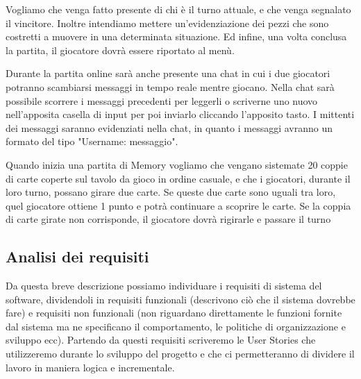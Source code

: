 \documentclass[12pt]{article}
\begin{document}
Vogliamo che venga fatto presente di chi è il turno attuale, e che venga segnalato il vincitore. Inoltre intendiamo mettere un'evidenziazione dei pezzi che sono costretti a muovere in una determinata situazione. Ed infine, una volta conclusa la partita, il giocatore dovrà essere riportato al menù.

Durante la partita online sarà anche presente una chat in cui i due giocatori potranno scambiarsi messaggi in tempo reale mentre giocano. Nella chat sarà possibile scorrere i messaggi precedenti per leggerli o scriverne uno nuovo nell'apposita casella di input per poi inviarlo cliccando l'apposito tasto. I mittenti dei messaggi saranno evidenziati nella chat, in quanto i messaggi avranno un formato del tipo "Username: messaggio".

Quando inizia una partita di Memory vogliamo che vengano sistemate 20 coppie di carte coperte sul tavolo da gioco in ordine casuale, e che i giocatori, durante il loro turno, possano girare due carte. Se queste due carte sono uguali tra loro, quel giocatore ottiene 1 punto e potrà continuare a scoprire le carte. Se la coppia di carte girate non corrisponde, il giocatore dovrà rigirarle e passare il turno

\subsection{Analisi dei requisiti}
Da questa breve descrizione possiamo individuare i requisiti di sistema del software, dividendoli in requisiti funzionali (descrivono ciò che il sistema dovrebbe fare) e requisiti non funzionali (non riguardano direttamente le funzioni fornite dal sistema ma ne specificano il comportamento, le politiche di organizzazione e sviluppo ecc). Partendo da questi requisiti scriveremo le User Stories che utilizzeremo durante lo sviluppo del progetto e che ci permetteranno di dividere il lavoro in maniera logica e incrementale.
\end{document}
